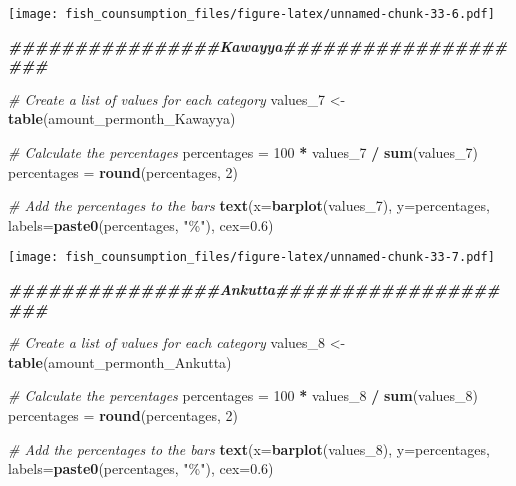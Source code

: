 \documentclass[
]{article}
\newenvironment{Shaded}{\begin{snugshade}}{\end{snugshade}}
\newcommand{\AttributeTok}[1]{\textcolor[rgb]{0.13,0.29,0.53}{#1}}
\newcommand{\CommentTok}[1]{\textcolor[rgb]{0.56,0.35,0.01}{\textit{#1}}}
\newcommand{\DecValTok}[1]{\textcolor[rgb]{0.00,0.00,0.81}{#1}}
\newcommand{\DocumentationTok}[1]{\textcolor[rgb]{0.56,0.35,0.01}{\textbf{\textit{#1}}}}
\newcommand{\FloatTok}[1]{\textcolor[rgb]{0.00,0.00,0.81}{#1}}
\newcommand{\FunctionTok}[1]{\textcolor[rgb]{0.13,0.29,0.53}{\textbf{#1}}}
\newcommand{\NormalTok}[1]{#1}
\newcommand{\OtherTok}[1]{\textcolor[rgb]{0.56,0.35,0.01}{#1}}
\newcommand{\SpecialCharTok}[1]{\textcolor[rgb]{0.81,0.36,0.00}{\textbf{#1}}}
\newcommand{\StringTok}[1]{\textcolor[rgb]{0.31,0.60,0.02}{#1}}
\begin{document}
\texttt{[image: fish\_counsumption\_files/figure-latex/unnamed-chunk-33-6.pdf]}

\begin{Shaded}
\begin{Highlighting}[]
\DocumentationTok{\#\#\#\#\#\#\#\#\#\#\#\#\#\#\#\#Kawayya\#\#\#\#\#\#\#\#\#\#\#\#\#\#\#\#\#\#\#\#}

\CommentTok{\# Create a list of values for each category}
\NormalTok{values\_7 }\OtherTok{\textless{}{-}} \FunctionTok{table}\NormalTok{(amount\_permonth\_Kawayya)}

\CommentTok{\# Calculate the percentages}
\NormalTok{percentages }\OtherTok{=} \DecValTok{100} \SpecialCharTok{*}\NormalTok{ values\_7 }\SpecialCharTok{/} \FunctionTok{sum}\NormalTok{(values\_7)}
\NormalTok{percentages }\OtherTok{=} \FunctionTok{round}\NormalTok{(percentages, }\DecValTok{2}\NormalTok{)}

\CommentTok{\# Add the percentages to the bars}
\FunctionTok{text}\NormalTok{(}\AttributeTok{x=}\FunctionTok{barplot}\NormalTok{(values\_7), }\AttributeTok{y=}\NormalTok{percentages, }\AttributeTok{labels=}\FunctionTok{paste0}\NormalTok{(percentages, }\StringTok{"\%"}\NormalTok{), }\AttributeTok{cex=}\FloatTok{0.6}\NormalTok{)}
\end{Highlighting}
\end{Shaded}

\texttt{[image: fish\_counsumption\_files/figure-latex/unnamed-chunk-33-7.pdf]}

\begin{Shaded}
\begin{Highlighting}[]
\DocumentationTok{\#\#\#\#\#\#\#\#\#\#\#\#\#\#\#\#Ankutta\#\#\#\#\#\#\#\#\#\#\#\#\#\#\#\#\#\#\#\#}

\CommentTok{\# Create a list of values for each category}
\NormalTok{values\_8 }\OtherTok{\textless{}{-}} \FunctionTok{table}\NormalTok{(amount\_permonth\_Ankutta)}

\CommentTok{\# Calculate the percentages}
\NormalTok{percentages }\OtherTok{=} \DecValTok{100} \SpecialCharTok{*}\NormalTok{ values\_8 }\SpecialCharTok{/} \FunctionTok{sum}\NormalTok{(values\_8)}
\NormalTok{percentages }\OtherTok{=} \FunctionTok{round}\NormalTok{(percentages, }\DecValTok{2}\NormalTok{)}

\CommentTok{\# Add the percentages to the bars}
\FunctionTok{text}\NormalTok{(}\AttributeTok{x=}\FunctionTok{barplot}\NormalTok{(values\_8), }\AttributeTok{y=}\NormalTok{percentages, }\AttributeTok{labels=}\FunctionTok{paste0}\NormalTok{(percentages, }\StringTok{"\%"}\NormalTok{), }\AttributeTok{cex=}\FloatTok{0.6}\NormalTok{)}
\end{Highlighting}
\end{Shaded}
\end{document}
